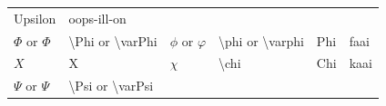 \documentclass[
]{book}
\begin{document}
\begin{longtable}[]{@{}llllll@{}}
\begin{minipage}[t]{0.06\columnwidth}
Upsilon\strut
\end{minipage} & \begin{minipage}[t]{0.08\columnwidth}\raggedright
oops-ill-on\strut
\end{minipage}\tabularnewline
\begin{minipage}[t]{0.18\columnwidth}\raggedright
\(\Phi\) or \(\varPhi\)\strut
\end{minipage} & \begin{minipage}[t]{0.17\columnwidth}\raggedright
\textbackslash Phi or \textbackslash varPhi\strut
\end{minipage} & \begin{minipage}[t]{0.18\columnwidth}\raggedright
\(\phi\) or \(\varphi\)\strut
\end{minipage} & \begin{minipage}[t]{0.17\columnwidth}\raggedright
\textbackslash phi or \textbackslash varphi\strut
\end{minipage} & \begin{minipage}[t]{0.06\columnwidth}\raggedright
Phi\strut
\end{minipage} & \begin{minipage}[t]{0.08\columnwidth}\raggedright
faai\strut
\end{minipage}\tabularnewline
\begin{minipage}[t]{0.18\columnwidth}\raggedright
\(Χ\)\strut
\end{minipage} & \begin{minipage}[t]{0.17\columnwidth}\raggedright
Χ\strut
\end{minipage} & \begin{minipage}[t]{0.18\columnwidth}\raggedright
\(\chi\)\strut
\end{minipage} & \begin{minipage}[t]{0.17\columnwidth}\raggedright
\textbackslash chi\strut
\end{minipage} & \begin{minipage}[t]{0.06\columnwidth}\raggedright
Chi\strut
\end{minipage} & \begin{minipage}[t]{0.08\columnwidth}\raggedright
kaai\strut
\end{minipage}\tabularnewline
\begin{minipage}[t]{0.18\columnwidth}\raggedright
\(\Psi\) or \(\varPsi\)\strut
\end{minipage} & \begin{minipage}[t]{0.17\columnwidth}\raggedright
\textbackslash Psi or \textbackslash varPsi\strut

\end{minipage}
\end{longtable}
\end{document}
